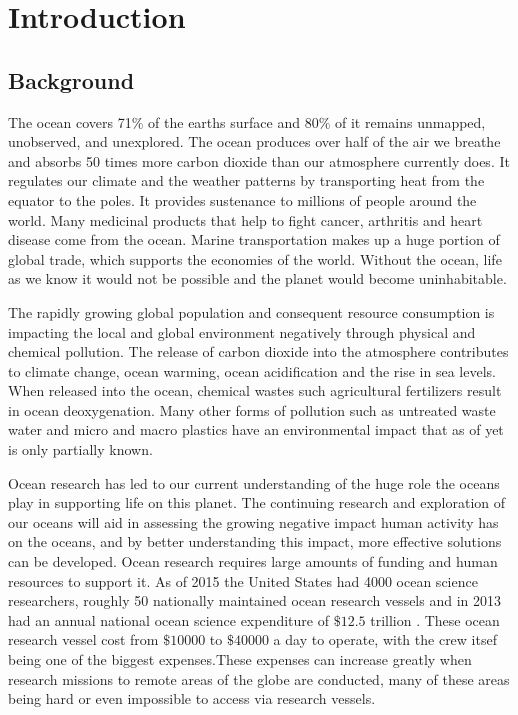 \graphicspath{{introduction/fig/}}

\chapter{Introduction}
\label{chap:introduction}

\section{Background}
The ocean covers 71$\%$ of the earths surface and 80$\%$ of it remains unmapped, unobserved, and unexplored. The ocean produces over half of the air we 
breathe and absorbs 50 times more carbon dioxide than our atmosphere currently does. It regulates our climate and the weather patterns by transporting heat
 from the equator to the poles. It provides sustenance to millions of people around the world. Many medicinal products that help to fight cancer, arthritis
  and heart disease come from the ocean. Marine transportation makes up a huge portion of global trade, which supports the economies of the world. Without 
  the ocean, life as we know it would not be possible and the planet would become uninhabitable.

The rapidly growing global population and consequent resource consumption is impacting the local and global environment negatively through physical and 
chemical pollution. The release of carbon dioxide into the atmosphere contributes to climate change, ocean warming, ocean acidification and the rise in sea
 levels. When released into the ocean, chemical wastes such agricultural fertilizers result in ocean deoxygenation. Many other forms of pollution such as 
 untreated waste water and micro and macro plastics have an environmental impact that as of yet is only partially known.

Ocean research has led to our current understanding of the huge role the oceans play in supporting life on this planet. The continuing research and 
exploration of our oceans will aid in assessing the growing negative impact human activity has on the oceans, and by better understanding this impact, 
more effective solutions can be developed. Ocean research requires large amounts of funding and human resources to support it. As of 2015 the United States 
had 4000 ocean science researchers, roughly 50 nationally maintained ocean research vessels and in 2013 had an annual national ocean science expenditure of
$\$12.5$ trillion \cite{Valdes}. These ocean research vessel cost from $\$10000$ to $\$40000$ a day to operate, with the crew itsef being one of the biggest 
expenses\cite{Valdes}.These expenses can increase greatly when research missions to remote areas of the globe are conducted, many of these areas being hard 
or even impossible to access via research vessels. 

